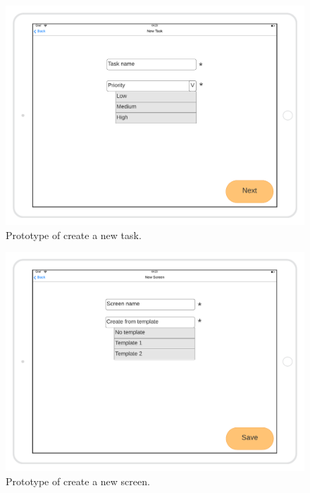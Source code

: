\begin{figure}[H]
    \includegraphics[width=\textwidth]{images/Create-new-task-mockup.png}
    \caption{Prototype of create a new task.}
\end{figure}

\begin{figure}[H]
    \includegraphics[width=\textwidth]{images/Create-new-screen-mockup.png}
    \caption{Prototype of create a new screen.}
\end{figure}

